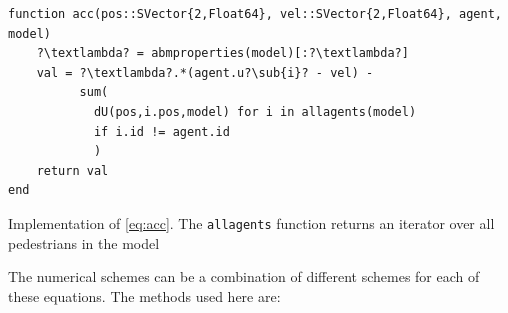 \begin{listing}[H]
    \begin{verbatim}    
function acc(pos::SVector{2,Float64}, vel::SVector{2,Float64}, agent, model)
    ?\textlambda? = abmproperties(model)[:?\textlambda?]
    val = ?\textlambda?.*(agent.u?\sub{i}? - vel) - 
          sum(
            dU(pos,i.pos,model) for i in allagents(model) 
            if i.id != agent.id
            )
    return val
end
\end{verbatim}
\caption{Implementation of \autoref{eq:acc}. The \texttt{allagents} function returns an iterator over all pedestrians in the model}
\label{code:acc}
\end{listing}
The numerical schemes can be a combination of different schemes for each of these equations. The methods used here are:
